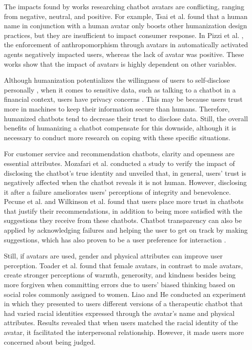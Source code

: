 The impacts found by works researching chatbot avatars are conflicting, ranging from negative, neutral, and positive. For example, Tsai et al.  found that a human name in conjunction with a human avatar only boosts other humanization design practices, but they are insufficient to impact consumer response. In Pizzi et al. , the enforcement of anthropomorphism through avatars in automatically activated agents negatively impacted users, whereas the lack of avatar was positive. These works show that the impact of avatars is highly dependent on other variables.

Although humanization potentializes the willingness of users to self-disclose personally , when it comes to sensitive data, such as talking to a chatbot in a financial context, users have privacy concerns . This may be because users trust more in machines to keep their information secure than humans. Therefore, humanized chatbots tend to decrease their trust to disclose data. Still, the overall benefits of humanizing a chatbot compensate for this downside, although it is necessary to conduct more research on coping with these specific situations.

For customer service and recommendation chatbots, clarity and openness are essential attributes. Mozafari et al.  conducted a study to verify the impact of disclosing the chatbot's true identity and unveiled that, in general, users' trust is negatively affected when the chatbot reveals it is not human. However, disclosing it after a failure ameliorates users' perceptions of integrity and benevolence. Pecune et al.  and Wilkinson et al.  found that users place more trust in chatbots that justify their recommendations, in addition to being more satisfied with the suggestions they receive from these chatbots. Chatbot transparency can also be applied by acknowledging failures and helping the user to get on track by making suggestions, which has also proven to be a user preference for interaction .

Still, if avatars are used, gender and physical attributes can improve user perception. Toader et al.  found that female avatars, in contrast to male avatars, create stronger perceptions of warmth, generosity, and kindness besides being more forgiven when committing errors due to users' biased thinking based on social roles commonly assigned to women. Liao and He  conducted an experiment in which they presented to users different versions of a therapeutic chatbot that had varied racial identities expressed through the avatar's name and physical attributes. Results revealed that when users matched the racial identity of the avatar, it facilitated the interpersonal relationship. However, it made users more concerned about being judged.

